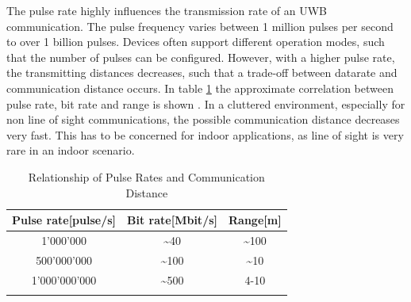 \noindent\hspace*{5mm}%
The pulse rate highly influences the transmission rate of an UWB communication. The pulse frequency varies between 1 million pulses per second to over 1 billion pulses. Devices often support different operation modes, such that the number of pulses can be configured. However, with a higher pulse rate, the transmitting distances decreases, such that a trade-off between datarate and communication distance occurs. In table \ref{tab:pulse_rate_range} the approximate correlation between pulse rate, bit rate and range is shown \cite{ITU}. In a cluttered environment, especially for non line of sight communications, the possible communication distance decreases very fast. This has to be concerned for indoor applications, as line of sight is very rare in an indoor scenario.

\begin{table}
\caption{Relationship of Pulse Rates and Communication Distance}
\label{tab:pulse_rate_range}
\centering
\begin{tabular}{c c c}
\toprule
\textbf{Pulse rate}[pulse/s] & \textbf{Bit rate}[Mbit/s] & \textbf{Range}[m]\\
\midrule
1'000'000 & \textasciitilde40 & \textasciitilde100\\
500'000'000 & \textasciitilde100 & \textasciitilde10\\
1'000'000'000 & \textasciitilde500 & 4-10\\
\bottomrule\\
\end{tabular}
\end{table}








